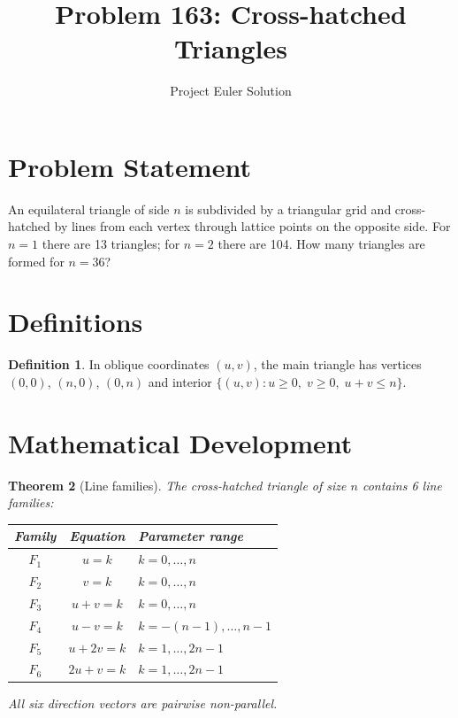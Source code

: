 \documentclass[12pt]{article}
\title{Problem 163: Cross-hatched Triangles}
\author{Project Euler Solution}
\date{}
\newtheorem{theorem}{Theorem}
\theoremstyle{definition}
\newtheorem{definition}[theorem]{Definition}
\begin{document}
\maketitle

\section{Problem Statement}
An equilateral triangle of side $n$ is subdivided by a triangular grid and cross-hatched by lines from each vertex through lattice points on the opposite side. For $n=1$ there are 13 triangles; for $n=2$ there are 104. How many triangles are formed for $n = 36$?

\section{Definitions}

\begin{definition}
In oblique coordinates $(u,v)$, the main triangle has vertices $(0,0)$, $(n,0)$, $(0,n)$ and interior $\{(u,v): u \ge 0,\; v \ge 0,\; u+v \le n\}$.
\end{definition}

\section{Mathematical Development}

\begin{theorem}[Line families]
The cross-hatched triangle of size $n$ contains 6 line families:
\begin{center}
\begin{tabular}{@{}ccl@{}}
\toprule
Family & Equation & Parameter range \\
\midrule
$F_1$ & $u = k$       & $k = 0, \ldots, n$ \\
$F_2$ & $v = k$       & $k = 0, \ldots, n$ \\
$F_3$ & $u + v = k$   & $k = 0, \ldots, n$ \\
$F_4$ & $u - v = k$   & $k = -(n-1), \ldots, n-1$ \\
$F_5$ & $u + 2v = k$  & $k = 1, \ldots, 2n-1$ \\
$F_6$ & $2u + v = k$  & $k = 1, \ldots, 2n-1$ \\
\bottomrule
\end{tabular}
\end{center}
All six direction vectors are pairwise non-parallel.
\end{theorem}
\end{document}
